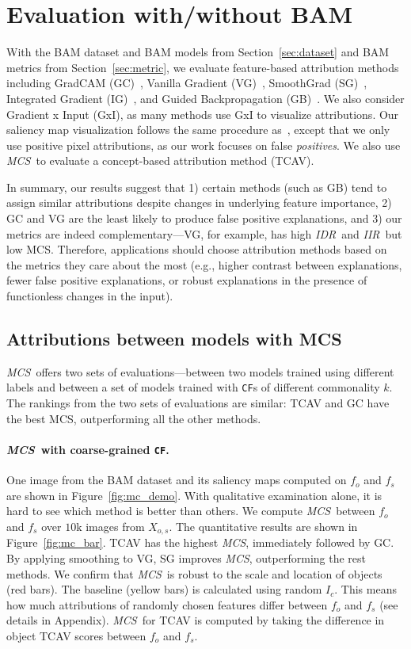 \documentclass[twoside]{article}
\newcommand{\CF}{\texttt{CF}}
\newcommand{\MCS}{\textit{MCS}}
\newcommand{\IDR}{\textit{IDR}}
\newcommand{\IIR}{\textit{IIR}}
\begin{document}
\section{Evaluation with/without BAM}
With the BAM dataset and BAM models from Section~\ref{sec:dataset} and BAM metrics from Section~\ref{sec:metric}, we evaluate feature-based attribution methods including GradCAM (GC)~\citep{Selvaraju16}, Vanilla Gradient (VG)~\citep{Simonyan13,Erhan09,Baehrens10}, SmoothGrad (SG)~\citep{Smilkov17}, Integrated Gradient (IG)~\citep{Sundararajan17}, and Guided Backpropagation (GB)~\citep{Springenberg14}. We also consider Gradient x Input (GxI), as many methods use GxI to visualize attributions. Our saliency map visualization follows the same procedure as~\citet{Smilkov17}, except that we only use positive pixel attributions, as our work focuses on false \textit{positives}. We also use \MCS~to evaluate a concept-based attribution method (TCAV).

In summary, our results suggest that 1) certain methods (such as GB) tend to assign similar attributions despite changes in underlying feature importance, 2) GC and VG are the least likely to produce false positive explanations, and 3) our metrics are indeed complementary---VG, for example, has high \IDR~and \IIR~but low MCS. Therefore, applications should choose attribution methods based on the metrics they care about the most (e.g., higher contrast between explanations, fewer false positive explanations, or robust explanations in the presence of functionless changes in the input).

\subsection{Attributions between models with MCS}
\MCS~offers two sets of evaluations---between two models trained using different labels and between a set of models trained with \CF s of different commonality $k$. The rankings from the two sets of evaluations are similar: TCAV and GC have the best MCS, outperforming all the other methods.

\paragraph{\MCS~with coarse-grained \CF.} One image from the BAM dataset and its saliency maps computed on $f_o$ and $f_s$ are shown in Figure~\ref{fig:mc_demo}. With qualitative examination alone, it is hard to see which method is better than others. We compute \MCS~between $f_o$ and $f_s$ over $10$k images from $X_{o,s}$. The quantitative results are shown in Figure~\ref{fig:mc_bar}. TCAV has the highest \MCS, immediately followed by GC. By applying smoothing to VG, SG improves \MCS, outperforming the rest methods. We confirm that \MCS~is robust to the scale and location of objects (red bars). The baseline (yellow bars) is calculated using random $I_c$. This means how much attributions of randomly chosen features differ between $f_o$ and $f_s$ (see details in Appendix). \MCS~for TCAV is computed by taking the difference in object TCAV scores between $f_o$ and $f_s$.
\end{document}
